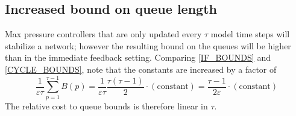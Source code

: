 %
%
%
%



\subsection*{Increased bound on queue length}
Max pressure controllers that are only updated every $\tau$ model time steps will stabilize a network; however the resulting bound on the queues will be higher than in the immediate feedback setting. 
Comparing \eqref{IF_BOUNDS} and \eqref{CYCLE_BOUNDS}, note that the constants are increased by a factor of
\begin{equation}
\dfrac{1}{\varepsilon \tau} \sum_{p=1}^{\tau - 1} B(p) = \dfrac{1}{\varepsilon \tau}  \dfrac{\tau(\tau - 1)}{2}\cdot(\text{constant}) = \dfrac{\tau - 1}{2\varepsilon} \cdot(\text{constant})
\end{equation}
The relative cost to queue bounds is therefore linear in $\tau$. 












